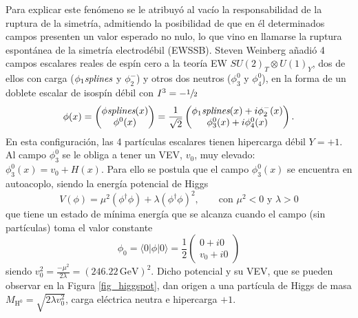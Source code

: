 Para explicar este fenómeno se le atribuyó al vacío la
responsabilidad de la ruptura de la simetría, admitiendo la posibilidad de que en él determinados
campos presenten un valor esperado no nulo, lo que vino en llamarse la ruptura espontánea de la simetría electrodébil (EWSSB). Steven Weinberg añadió 4 campos escalares reales de espín cero a la teoría EW $SU(2)_T \otimes U(1)_Y$, dos de ellos con carga ($\phi_1\emph{splines}$ y $\phi_2^-$) y otros dos neutros ($\phi_3^0$ y $\phi_4^0$), en la forma de un doblete escalar de isospín débil con $I^3 = -\sfrac{1}{2}$
\begin{equation}
  \phi(x) = \begin{pmatrix}
    \phi\emph{splines}(x) \\ \phi^0 (x) 
  \end{pmatrix} = \frac{1}{\sqrt{2}} \begin{pmatrix}
    \phi_1\emph{splines}(x) + i\phi_2^-(x) \\ \phi_3^0(x) + i\phi_4^0(x) 
  \end{pmatrix}.
\end{equation}
En esta configuración, las 4 partículas escalares tienen hipercarga
débil $Y = +1$. Al campo $\phi_3^0$
se le obliga a tener un VEV, $v_0$, muy
elevado: $\phi_3^0(x) = v_0+ H(x)$.
Para ello se postula que el campo $\phi_3^0 (x)$ se encuentra en autoacoplo, siendo la energía potencial de Higgs 
\begin{equation}
V(\phi) = \mu^2 (\phi^{\dagger} \phi) + \lambda (\phi^{\dagger} \phi)^2,  \qquad \text{con } \mu^2<0 \text{ y } \lambda >0
\end{equation}
que tiene un estado de mínima energía que se alcanza cuando el campo (sin partículas) toma el valor constante
\[\phi_0 = \langle 0 | \phi | 0 \rangle = \frac{1}{2} \begin{pmatrix}
  0+i0\\ v_0+ i0
\end{pmatrix}\]
siendo $v_0^2 = \frac{-\mu^2}{2 \lambda} = (246.22 \, \mathrm{GeV})^2$. Dicho potencial y su VEV, que se pueden observar en la Figura \ref{fig_higgspot}, dan origen a una partícula de Higgs de masa $M_{\mathrm{H^0}} = \sqrt{2 \lambda v_0^2}$, carga eléctrica neutra e hipercarga $+1$.  

